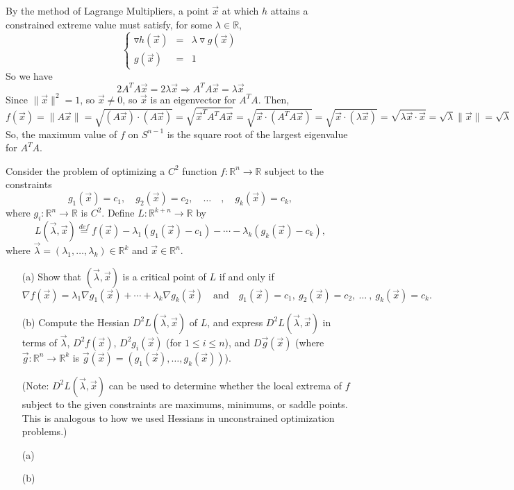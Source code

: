 \documentclass[11pt,letterpaper,cm]{nupset}
\begin{document}
\begin{solution}
	By the method of Lagrange Multipliers, a point $\vec{x}$ at which $h$ attains a constrained extreme value must satisfy, for some $\lambda\in\mathbb{R}$,
	$$\left\{\begin{array}{rcrcrcl} \triangledown h(\vec{x})&=&\lambda\triangledown g(\vec{x})\\g(\vec{x})&=&1\end{array}\right.$$
	So we have
	$$2A^TA\vec{x}=2\lambda\vec{x}\Rightarrow A^TA\vec{x}=\lambda\vec{x}$$
	Since $\|\vec{x}\|^2=1$, so $\vec{x}\neq 0$, so $\vec{x}$ is an eigenvector for $A^TA$. Then,
	$$f(\vec{x})=\|A\vec{x}\|=\sqrt{(A\vec{x})\cdot(A\vec{x})}=\sqrt{\vec{x}^TA^TA\vec{x}}=\sqrt{\vec{x}\cdot(A^TA\vec{x})}=\sqrt{\vec{x}\cdot(\lambda\vec{x})}=\sqrt{\lambda\vec{x}\cdot\vec{x}}=\sqrt{\lambda}\|\vec{x}\|=\sqrt{\lambda}$$
	So, the maximum value of $f$ on $S^{n-1}$ is the square root of the largest eigenvalue for $A^TA$.
\end{solution}
\newpage

\begin{problem}[Exercise 7] Consider the problem of optimizing a $C^2$ function $f:\mathbb{R}^n\to\mathbb{R}$ subject to the constraints $$g_1(\vec{x})=c_1,\quad g_2(\vec{x})=c_2,\quad\ldots\quad,\quad g_k(\vec{x})=c_k,$$ where $g_i:\mathbb{R}^n\to\mathbb{R}$ is $C^2$. Define $L:\mathbb{R}^{k+n}\to \mathbb{R}$ by $$L(\vec{\lambda},\vec{x})\stackrel{def}{=} f(\vec{x})-\lambda_1(g_1(\vec{x})-c_1)-\cdots-\lambda_k(g_k(\vec{x})-c_k),$$ where $\vec{\lambda}=(\lambda_1,\ldots,\lambda_k)\in \mathbb{R}^k$ and $\vec{x}\in\mathbb{R}^n$.
	\begin{itemize}
		\item[(a)] Show that $(\vec{\lambda},\vec{x})$ is a critical point of $L$ if and only if 
		$$\nabla f(\vec{x})=\lambda_1\nabla g_1(\vec{x})+\cdots+\lambda_k\nabla g_k(\vec{x})\quad\mbox{and}\quad g_1(\vec{x})=c_1,\ g_2(\vec{x})=c_2,\ \ldots\ ,\ g_k(\vec{x})=c_k.$$
		\item[(b)] Compute the Hessian $D^2 L(\vec{\lambda},\vec{x})$ of $L$, and express $D^2 L(\vec{\lambda},\vec{x})$ in terms of $\vec{\lambda}$, $D^2 f(\vec{x})$, $D^2 g_i(\vec{x})$ (for $1\leq i\leq n$), and $D\vec{g}(\vec{x})$ (where $\vec{g}:\mathbb{R}^n\to\mathbb{R}^k$ is $\vec{g}(\vec{x})=(g_1(\vec{x}),\ldots,g_k(\vec{x}))$).
		\medskip
		
		(Note: $D^2 L(\vec{\lambda},\vec{x})$ can be used to determine whether the local extrema of $f$ subject to the given constraints are maximums, minimums, or saddle points.  This is analogous to how we used Hessians in unconstrained optimization problems.)
	\end{itemize}
\end{problem}
\begin{solution}
	\begin{itemize}
		\item[(a)]
		\item[(b)]
	\end{itemize}
\end{solution}
\newpage
\end{document}
